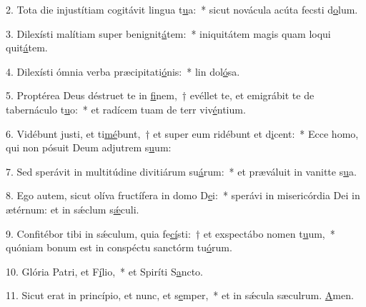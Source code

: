 2. Tota die injustítiam cogitávit lingua t\uline{u}a:~* sicut novácula acúta fecsti d\uline{o}lum.\par 
3. Dilexísti malítiam super benignit\uline{á}tem:~* iniquitátem magis quam loqui quit\uline{á}tem.\par 
4. Dilexísti ómnia verba præcipitati\uline{ó}nis:~* lin dol\uline{ó}sa.\par 
5. Proptérea Deus déstruet te in \uline{fi}nem,~† evéllet te, et emigrábit te de tabernáculo t\uline{u}o:~* et radícem tuam de terr viv\uline{é}ntium.\par 
6. Vidébunt justi, et ti\uline{mé}bunt,~† et super eum ridébunt et d\uline{i}cent:~* Ecce homo, qui non pósuit Deum adjutrem s\uline{u}um:\par 
7. Sed sperávit in multitúdine divitiárum su\uline{á}rum:~* et præváluit in vanitte s\uline{u}a.\par 
8. Ego autem, sicut olíva fructífera in domo D\uline{e}i:~* sperávi in misericórdia Dei in ætérnum: et in sǽclum s\uline{ǽ}culi.\par 
9. Confitébor tibi in sǽculum, quia fe\uline{cí}sti:~† et exspectábo nomen t\uline{u}um,~* quóniam bonum est in conspéctu sanctórm tu\uline{ó}rum.\par 
10. Glória Patri, et F\uline{í}lio,~* et Spiríti S\uline{a}ncto.\par 
11. Sicut erat in princípio, et nunc, et s\uline{e}mper,~* et in sǽcula sæculrum. \uline{A}men.\par 

